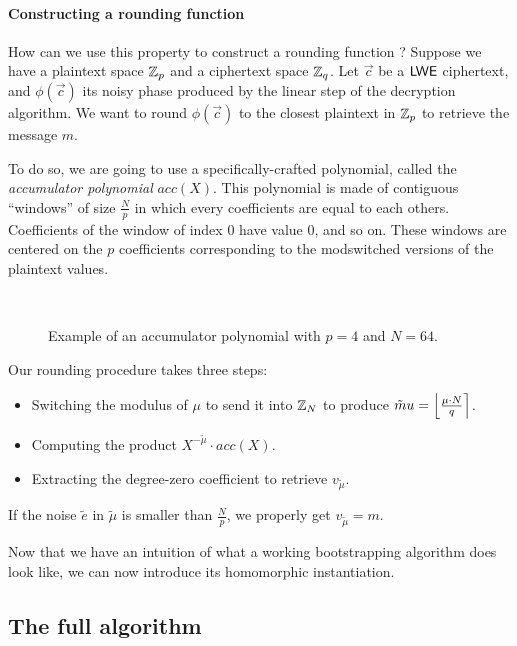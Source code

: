 \paragraph{Constructing a rounding function}
How can we use this property to construct a rounding function ? Suppose we have a plaintext space $\mathbb{Z}_p$ and a ciphertext space $\mathbb{Z}_q$. Let $\vec c$ be  a $\textsf{LWE}$ ciphertext, and $\phi(\vec c)$ its noisy phase produced by the linear step of the decryption algorithm. We want to round $\phi(\vec c)$ to the closest plaintext in $\mathbb{Z}_p$ to retrieve the message $m$.

To do so, we are going to use a specifically-crafted polynomial, called the \textit{accumulator polynomial} $acc(X)$. This polynomial is made of contiguous ``windows'' of size $\frac N p$ in which every coefficients are equal to each others. Coefficients of the window of index 0 have value 0, and so on. These windows are centered on the $p$ coefficients corresponding to the modswitched versions of the plaintext values.





\begin{figure}[htbp]
	\centering
	 \\[1em] %
	\label{fig:illustration_accumulator}
	\caption{Example of an accumulator polynomial with $p=4$ and $N=64$.}
\end{figure}



Our rounding procedure takes three steps:
\begin{itemize}
	\item Switching the modulus of $\mu$ to send it into $\mathbb{Z}_N$ to produce $\tilde mu = \left \lfloor \frac{\mu \cdot N}{q} \right \rceil$.
	\item Computing the product $X^{- \tilde \mu} \cdot acc(X)$.
	\item Extracting the degree-zero coefficient to retrieve $v_{\tilde \mu}$.
\end{itemize}

If the noise $\tilde e$ in $\tilde \mu$ is smaller than $\frac{N}{p}$, we properly get $v_{\tilde \mu} = m$.



Now that we have an intuition of what a working bootstrapping algorithm does look like, we can now introduce its homomorphic instantiation. 


\subsection{The full algorithm}









